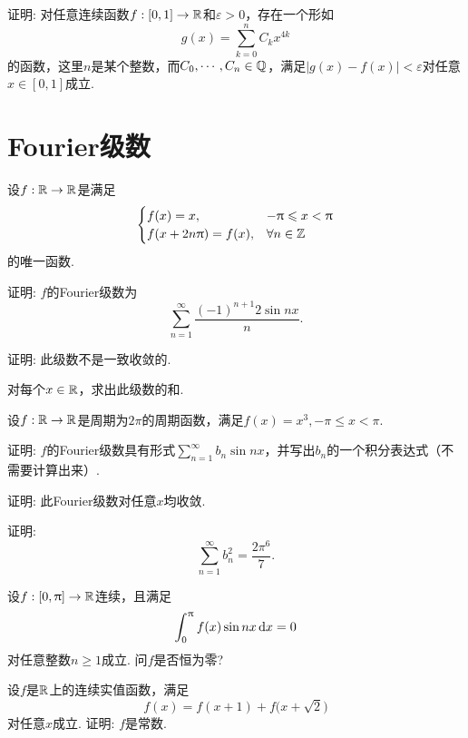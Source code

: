 \begin{example}
  证明: 对任意连续函数$f:[0,1]\to\mathbb R$和$\varepsilon>0$，存在一个形如
  \[ g(x) = \sum_{k=0}^n C_kx^{4k} \]
  的函数，这里$n$是某个整数，而$C_0,\cdots,C_n\in\mathbb Q$，满足$|g(x)-f(x)|<\varepsilon$对任意$x\in[0,1]$成立.
\end{example}

\section{Fourier级数}
\begin{example}
  设$f:\mathbb R\to\mathbb R$是满足
  \[
      \begin{cases}
        f(x) = x, & -\uppi \leqslant x<\uppi\\
        f(x+2n\uppi) = f(x), & \forall n\in\mathbb Z
      \end{cases}
  \]
  的唯一函数.
  \begin{eenum}
    \item 证明: $f$的Fourier级数为
      \[ \sum_{n=1}^\infty\frac{(-1)^{n+1}2\sin nx}n. \]
    \item 证明: 此级数不是一致收敛的.
    \item 对每个$x\in \mathbb R$，求出此级数的和.
  \end{eenum}
\end{example}

\begin{example}
  设$f:\mathbb R\to\mathbb R$是周期为$2\pi$的周期函数，满足$f(x)=x^3,-\pi\le x<\pi$.
  \begin{eenum}
    \item 证明: $f$的Fourier级数具有形式$\sum_{n=1}^\infty b_n\sin nx$，并写出$b_n$的一个积分表达式（不需要计算出来）.
    \item 证明: 此Fourier级数对任意$x$均收敛.
    \item 证明:
    \[ \sum_{n=1}^\infty b_n^2=\frac{2\pi^6}7. \]
  \end{eenum}
\end{example}

\begin{example}
  设$f:[0,\uppi]\to\mathbb R$连续，且满足
  \[ \int_0^\uppi f(x)\sin nx\,\mathrm dx= 0 \]
  对任意整数$n\ge1$成立. 问$f$是否恒为零?
\end{example}

\begin{example}
  设$f$是$\mathbb R$上的连续实值函数，满足
  \[ f(x)=f(x+1)+f\Big(x+\sqrt2\Big) \]
  对任意$x$成立. 证明: $f$是常数.
\end{example}

